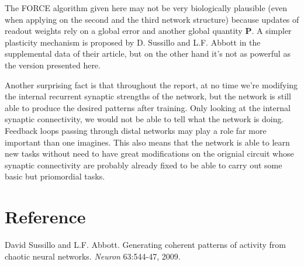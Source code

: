 The FORCE algorithm given here may not be very biologically plausible
(even when applying on the second and the third network structure)
because updates of readout weights rely on a global error and another
global quantity $\mathbf{P}$. A simpler plasticity mechanism is proposed 
by D. Sussillo and L.F. Abbott in the supplemental data of their article,
but on the other hand it's not as powerful as the version presented here.

Another surprising fact is that throughout the report, at no time we're
modifying the internal recurrent synaptic strengths of the network, but
the network is still able to produce the desired patterns after training.
Only looking at the internal synaptic connectivity, we would not be able
to tell what the network is doing. Feedback loops passing through distal
networks may play a role far more important than one imagines. This
also means that the network is able to learn new tasks without need to
have great modifications on the orignial circuit whose synaptic
connectivity are probably already fixed to be able to carry out some 
basic but priomordial tasks.


\section{Reference}

\noindent
David Sussillo and L.F. Abbott. Generating coherent patterns of activity from
chaotic neural networks. \textit{Neuron} 63:544-47, 2009.
